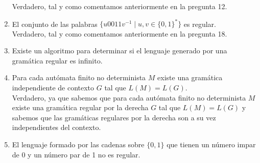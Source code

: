 \begin{enumerate}
        Verdadero, tal y como comentamos anteriormente en la pregunta 12.
    \item El conjunto de las palabras $\{u0011v^{-1}\mid u,v\in {\{0,1\}}^{\ast}\}$ es regular.\\

        Verdadero, tal y como comentamos anteriormente en la pregunta 18.
    \item Existe un algoritmo para determinar si el lenguaje generado por una gramática regular es infinito.\\

    \item Para cada autómata finito no determinista $M$ existe una gramática independiente de contexto $G$ tal que $L(M) = L(G)$.\\

        Verdadero, ya que sabemos que para cada autómata finito no determinista $M$ existe una gramática regular por la derecha $G$ tal que $L(M) = L(G)$ y sabemos que las gramáticas regulares por la derecha son a su vez independientes del contexto.
    \item El lenguaje formado por las cadenas sobre $\{0,1\}$ que tienen un número impar de 0 y un número par de 1 no es regular.\\


\end{enumerate}
